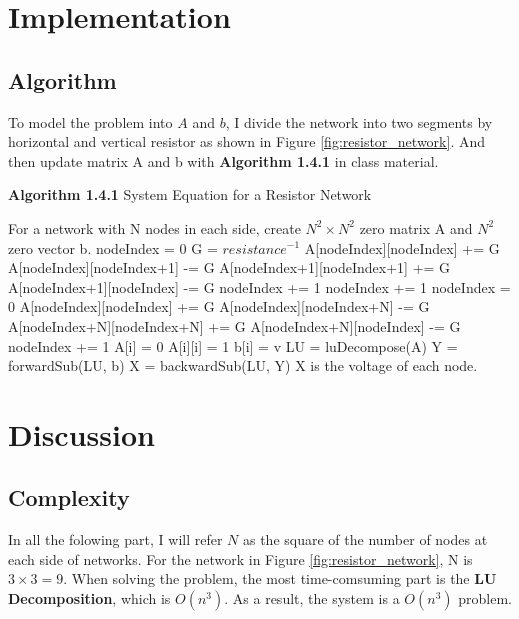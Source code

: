 \documentclass{article}
\begin{document}
\section{Implementation}
\subsection{Algorithm}
To model the problem into $A$ and $b$, I divide the network into two segments by horizontal and vertical resistor as shown in
Figure \ref{fig:resistor_network}. And then update matrix A and b with \textbf{Algorithm 1.4.1} in class material.
\begin{algorithm}[htb]
    \caption*{\textbf{Algorithm 1.4.1} System Equation for a Resistor Network}
    \label{algo:resistor_network}
    \begin{algorithmic}
        \State For a network with N nodes in each side, create $N^2 \times N^2$ zero matrix A and $N^2$ zero vector b.
        \State nodeIndex = 0
        \State G = $resistance^{-1}$
                \State A[nodeIndex][nodeIndex] += G
                \State A[nodeIndex][nodeIndex+1] -= G
                \State A[nodeIndex+1][nodeIndex+1] += G
                \State A[nodeIndex+1][nodeIndex] -= G
                \State nodeIndex += 1
            \EndFor
            \State nodeIndex += 1
        \EndFor
        \State nodeIndex = 0
                \State A[nodeIndex][nodeIndex] += G
                \State A[nodeIndex][nodeIndex+N] -= G
                \State A[nodeIndex+N][nodeIndex+N] += G
                \State A[nodeIndex+N][nodeIndex] -= G
                \State nodeIndex += 1
            \EndFor
        \EndFor
            \State A[i] = 0
            \State A[i][i] = 1
            \State b[i] = v
        \EndFor
        \State LU = luDecompose(A)
        \State Y = forwardSub(LU, b)
        \State X = backwardSub(LU, Y)
        \State X is the voltage of each node.
    \end{algorithmic}
\end{algorithm}


\section{Discussion}
\subsection{Complexity}
\label{sec:complexity}
In all the folowing part, I will refer $N$ as the square of the number of nodes at each side of networks. For the network in 
Figure \ref{fig:resistor_network}, N is $3 \times 3 = 9$. \newline
When solving the problem, the most time-comsuming part is the \textbf{LU Decomposition}, which is $O(n^3)$. As a result, the
system is a {\boldmath$O(n^3)$} problem.
\end{document}
